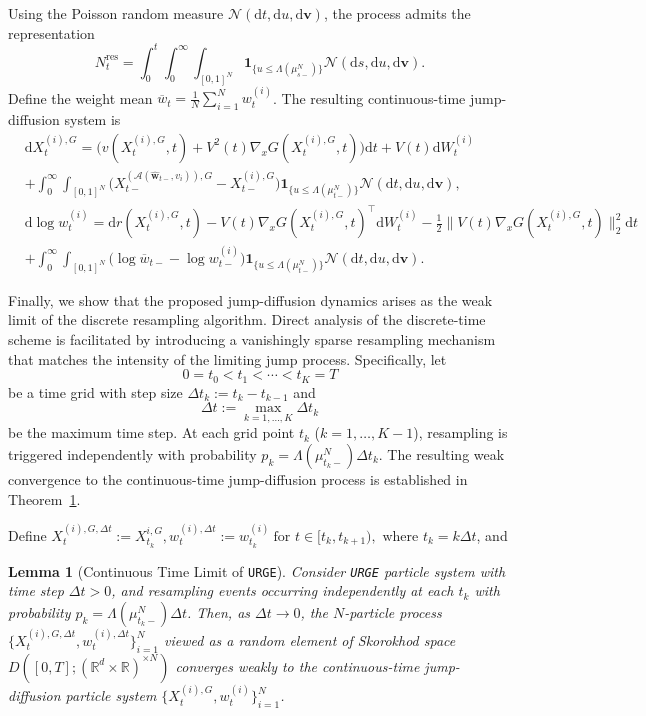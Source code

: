 \documentclass{article}
\newcommand{\mathbbm}[1]{\boldsymbol{#1}}
\theoremstyle{plain}
\newtheorem{lemma}[theorem]{Lemma}
\theoremstyle{definition}
\theoremstyle{remark}
\newcommand{\dif}{{\mathrm{d}}}
\newcommand{\R}{{\mathbb{R}}}
\begin{document}
Using the Poisson random measure \(\mathcal{N}(\dif t,\dif u, \dif \mathbbm{v})\), the process admits the representation \[N_t^{\mathrm{res}}= \int_0^t\int_0^\infty\int_{[0,1]^N}\mathbbm{1}_{\{u \le \Lambda(\mu^N_{s-})\}}\mathcal{N}(\dif s,\dif u, \dif \mathbbm{v}).\] 
Define the weight mean  
\(\overline w_t = \frac{1}{N}\sum_{i=1}^N w_t^{(i)}\). The resulting continuous-time jump-diffusion system is
\begin{subequations}
\begin{align*}
&\dif X_t^{(i),G} = 
\big(v(X_t^{(i),G},t) + V^2(t) \nabla_x G(X_t^{(i),G},t)\big)\dif t + V(t)\dif W_t^{(i)}\\
&+ \int_0^\infty\int_{[0,1]^N}
   \big(X^{(\mathcal{A}(\mathbbm{\widehat  w}_{t-},v_i)),G}_{t-} - X_{t-}^{(i),G}\big)\mathbbm{1}_{\{u \le \Lambda(\mu^N_{t-})\}}
   \mathcal{N}(\dif t,\dif u, \dif \mathbbm{v}),
\\[6pt]
&\dif \log w_t^{(i)} =
\dif r(X^{(i),G}_t,t)-V(t) \nabla_x G(X_t^{(i),G},t)^\top \dif W_t^{(i)}-\frac12 \|V(t) \nabla_x G(X_t^{(i),G},t)\|_2^2\dif t \\
&+ \int_0^\infty\int_{[0,1]^N}
   \big(\log \overline w_{t-} - \log w_{t-}^{(i)}\big)\mathbbm{1}_{\{u \le \Lambda(\mu^N_{t-})\}}
   \mathcal{N}(\dif t,\dif u, \dif \mathbbm{v}).
\end{align*}
\end{subequations}

Finally, we show that the proposed jump-diffusion dynamics arises as the weak limit of the discrete resampling algorithm. Direct analysis of the discrete-time scheme is facilitated by introducing a vanishingly sparse resampling mechanism that matches the intensity of the limiting jump process. Specifically, let 
\[
    0=t_0<t_1<\cdots<t_K=T
\] be a time grid with step size \(\Delta t_k := t_k - t_{k-1}\) and 
$$
    \Delta t := \max_{k=1,\dots,K} \Delta t_k
$$ 
be the maximum time step. At each grid point \(t_k\) (\(k=1,\dots,K-1\)), resampling is triggered independently with probability \(p_k = \Lambda(\mu^N_{t_k-})\Delta t_k.\) The resulting weak convergence to the continuous-time jump-diffusion process is established in Theorem~\ref{lem:continuous_is_limit_of_discrete}.

Define \(X^{(i),G,\Delta t}_t := X_{t_k}^{i,G},w^{(i),\Delta t}_t := w^{(i)}_{t_k} \ \text{for } t \in [t_k, t_{k+1}), \text{ where } t_k = k\Delta t\), and 


\begin{lemma}[Continuous Time Limit of \texttt{URGE}]
\label{lem:continuous_is_limit_of_discrete}
Consider \texttt{URGE} particle system with time step $\Delta t>0$, and resampling events occurring independently at each $t_k$ with probability \(p_k=\Lambda(\mu^N_{t_k-})\Delta t\). Then, as $\Delta t\to 0$, the $N$-particle process \(\{X^{(i),G,\Delta t}_t, w^{(i),\Delta t}_t\}_{i=1}^N\) viewed as a random element of Skorokhod space $D([0,T];(\R^d \times \R)^{\times N})$ converges weakly to the continuous-time jump-diffusion particle system \(\{X^{(i),G}_t, w^{(i)}_t\}_{i=1}^N\).
\end{lemma}
\end{document}
